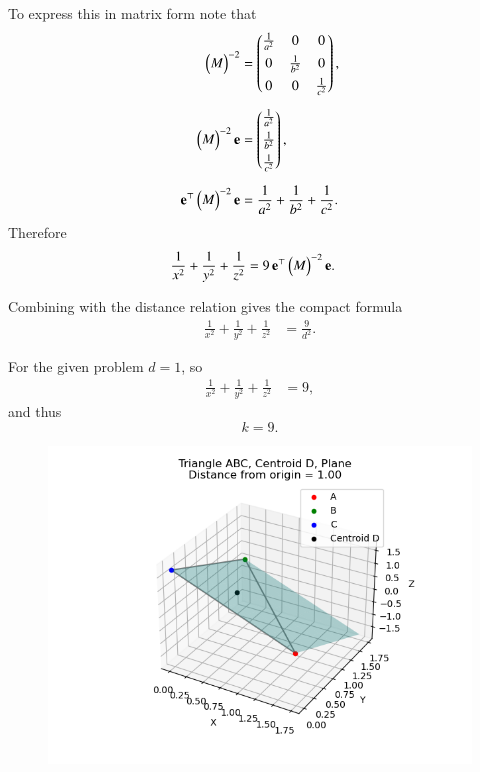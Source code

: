 \documentclass[journal]{IEEEtran}
\begin{document}
To express this in matrix form note that
\begin{align}
\begin{pmatrix}M\end{pmatrix}^{-2} &= \begin{pmatrix}\tfrac{1}{a^2}&0&0\\[4pt]0&\tfrac{1}{b^2}&0\\[4pt]0&0&\tfrac{1}{c^2}\end{pmatrix}, \\[6pt]
\begin{pmatrix}M\end{pmatrix}^{-2}\mathbf{e} &= \begin{pmatrix}\tfrac{1}{a^2}\\[4pt]\tfrac{1}{b^2}\\[4pt]\tfrac{1}{c^2}\end{pmatrix}, \\[6pt]
\mathbf{e}^\top \begin{pmatrix}M\end{pmatrix}^{-2}\mathbf{e} &= \frac{1}{a^2}+\frac{1}{b^2}+\frac{1}{c^2}.
\end{align}
Therefore
\begin{align}
\frac{1}{x^2}+\frac{1}{y^2}+\frac{1}{z^2}
&= 9\,\mathbf{e}^\top \begin{pmatrix}M\end{pmatrix}^{-2}\mathbf{e}.
\end{align}

Combining with the distance relation gives the compact formula
\begin{align}
\frac{1}{x^2}+\frac{1}{y^2}+\frac{1}{z^2} &= \frac{9}{d^2}.
\end{align}

For the given problem \(d=1\), so
\begin{align}
\frac{1}{x^2}+\frac{1}{y^2}+\frac{1}{z^2} &= 9,
\end{align}
and thus
\[
\boxed{k=9}.
\]

\begin{figure}[H]
    \centering
    \includegraphics[width=0.8\linewidth]{figs/fig1.png}
    \caption{}
    \label{fig:fig1}
\end{figure}
\end{document}
